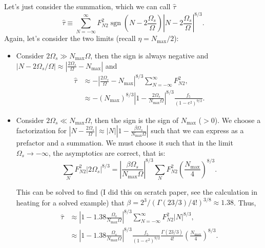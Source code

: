 \documentclass[11pt,
        usenames, %
        dvipsnames %
    ]{article}
\newcommand*{\abs}[1]{\left|#1\right|}
\newcommand*{\p}[1]{\left(#1\right)}
\DeclareMathOperator{\sgn}{sgn}
\begin{document}
Let's just consider the summation, which we can call $\hat{\tau}$
\begin{equation}
    \hat{\tau} \equiv \sum\limits_{N = -\infty}^\infty
        F_{N2}^2 \sgn\p{N - 2\frac{\Omega_s}{\Omega}}
            \abs{N - 2\frac{\Omega_s}{\Omega}}^{8/3}.
\end{equation}
Again, let's consider the two limits (recall $\eta = N_{\max} / 2$):
\begin{itemize}
    \item Consider $2\Omega_s \gg N_{\max}\Omega$, then the sign is always
        negative and $\abs{N - 2\Omega_s/\Omega} \approx
        \abs{\frac{2\Omega_s}{\Omega} - N_{\max}}$ and
        \begin{align}
            \hat{\tau}
                &\approx -\abs{\frac{2\Omega_s}{\Omega} - N_{\max}}^{8/3}
                    \sum\limits_{N = -\infty}^\infty F_{N2}^2,\\
                &\approx -\p{N_{\max}}^{8/3}
                    \abs{1 - \frac{2\Omega_s}{N_{\max}\Omega}}^{8/3}
                    \frac{f_5}{\p{1 - e^2}^{9/2}}.
        \end{align}

    \item Consider $2\Omega_s \ll N_{\max} \Omega$, then the sign is the
        sign of $N_{\max}$ ($>0$). We choose a factorization for $\abs{N -
        \frac{2\Omega_s}{\Omega}} \approx \abs{N}\abs{1 -
        \frac{\beta\Omega_s}{N_{\max}\Omega}}$ such that we can express as a
        prefactor and a summation. We must choose it such that in the limit
        $\Omega_s \to -\infty$, the asymptotics are correct, that is:
        \begin{equation}
            \sum\limits_{N} F_{N2}^2 \abs{2\Omega_s}^{8/3}
                = \abs{\frac{\beta\Omega_s}{N_{\max}\Omega}}^{8/3}
                    \sum\limits_{N}F_{N2}^2 \p{\frac{N_{\max}}{4}}^{8/3}.
        \end{equation}

        This can be solved to find (I did this on scratch paper, see the
        calculation in heating for a solved example) that $\beta =
        2^3 / \p{\Gamma(23/3) / 4!}^{3/8} \approx 1.38$. Thus,
        \begin{align}
            \hat{\tau}
                &\approx \abs{1 - 1.38\frac{\Omega_s}{N_{\max}\Omega}}^{8/3}
                    \sum\limits_{N = -\infty}^\infty F_{N2}^2 \abs{N}^{8/3},\\
                &\approx \abs{1 - 1.38\frac{\Omega_s}{N_{\max}\Omega}}^{8/3}
                    \frac{f_5}{\p{1 - e^2}^{9/2}}
                    \frac{\Gamma(23/3)}{4!}
                    \p{\frac{N_{\max}}{4}}^{8/3}.
        \end{align}
\end{itemize}
\end{document}
